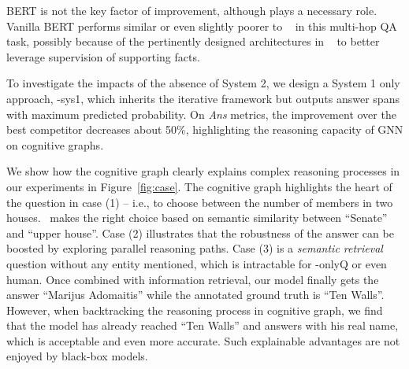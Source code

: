 BERT is not the key factor of improvement, although plays a necessary role. 
Vanilla BERT
performs similar or even slightly poorer to ~\cite{yang2018hotpotqa} in this multi-hop QA task, possibly because of the pertinently designed architectures in ~\citet{yang2018hotpotqa} to better leverage supervision of supporting facts.


To investigate the impacts of the absence of System 2, we design a System 1 only approach, \name-sys1, which inherits the iterative framework
but outputs answer spans with maximum predicted probability.
On \textit{Ans} metrics, the improvement over the best competitor decreases about 50\%, highlighting the reasoning capacity of GNN on cognitive graphs.


We show how the cognitive graph clearly explains complex reasoning processes in our experiments in Figure~\ref{fig:case}. The cognitive graph highlights the heart of the question in case (1) -- i.e., to choose between the number of members in two houses. \name~makes the right choice based on semantic similarity between ``Senate'' and ``upper house''. Case (2) illustrates that the robustness of the answer can be boosted by exploring parallel reasoning paths. Case (3) is a \emph{semantic retrieval} question without any entity mentioned, which is intractable for \name-onlyQ or even human. Once combined with information retrieval, our model finally gets the answer ``Marijus Adomaitis'' while the annotated ground truth is ``Ten Walls''. However, when backtracking the reasoning process in cognitive graph, we find that the model has already reached ``Ten Walls'' and answers with his real name, which is acceptable and even more accurate. Such explainable advantages are not enjoyed by black-box models.

